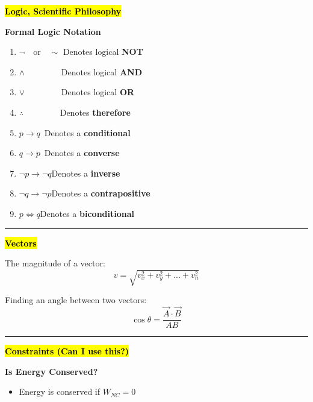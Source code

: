\documentclass[	DIV=calc,%
							paper=a4,%
							fontsize=11pt,%
							twocolumn]{scrartcl} %
\date{\today} %
\newcommand{\hformbar}[1]{\vspace{5pt}\hrule\vspace{10pt}} %
\newcommand{\formdesc}[1]{\noindent\textbf{#1}}
\begin{document}
\thispagestyle{fancy} 	%
\hspace{10pt}

\formdesc{\hl{Logic, Scientific Philosophy}}

\textbf{Formal Logic Notation}
\begin{enumerate}
    \item $\neg\quad\text{or}\quad\sim$
        Denotes logical \textbf{NOT}
    \item $\land\qquad\qquad$
        Denotes logical \textbf{AND}
    \item $\lor\qquad\qquad$
        Denotes logical \textbf{OR}
    \item $\therefore\qquad\qquad$
        Denotes \textbf{therefore}
    \item $p\rightarrow q$\qquad \  Denotes a \textbf{conditional}
    \item $q\rightarrow p$\qquad \ Denotes a \textbf{converse}
    \item $\neg p\rightarrow\neg q$\quad Denotes a \textbf{inverse}
    \item $\neg q\rightarrow\neg p$\quad Denotes a \textbf{contrapositive}
    \item $p\iff q$\quad Denotes a \textbf{biconditional}
\end{enumerate}

\hformbar{}


\formdesc{\hl{Vectors}}

The magnitude of a vector:
\begin{equation}
    v = \sqrt{v_x^2 + v_y^2 + ... + v_n^2}
\end{equation}

Finding an angle between two vectors:
\begin{equation}
    \cos\theta = \frac{\vec A \cdot \vec B}{AB}
\end{equation}
\hformbar{}

\formdesc{\hl{Constraints (Can I use this?)}}

\textbf{Is Energy Conserved?}
\begin{itemize}
    \item Energy is conserved if \textbf{$W_{NC}=0$}
\end{itemize}
\end{document}
